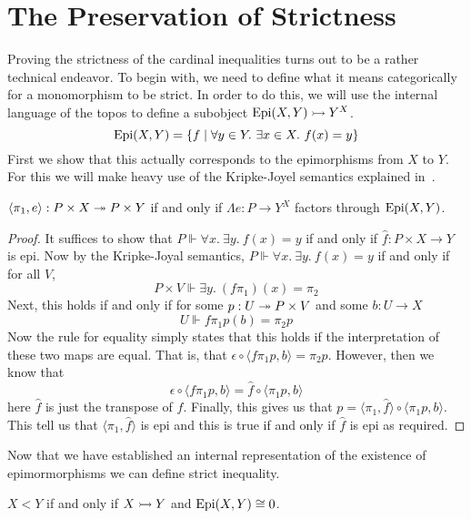 \section{The Preservation of Strictness}\label{sec:strictness}

Proving the strictness of the cardinal inequalities turns out to be a
rather technical endeavor. To begin with, we need to define what it
means categorically for a monomorphism to be strict. In order to do
this, we will use the internal language of the topos to define a
subobject $\operatorname{Epi}(X, Y) \rightarrowtail Y^X$.
\[
  \epis(X, Y) = \{f \mid \forall y \in Y.\ \exists x \in X.\ f(x) = y\}
\]
First we show that this actually corresponds to the epimorphisms from
$X$ to $Y$. For this we will make heavy use of the Kripke-Joyel
semantics explained in~\citet[Chapter~6]{MacLane:92}.

\begin{lem}\label{lem:strictness:epis}
  $\langle \pi_1, e \rangle : P \times X \twoheadrightarrow P \times Y$ if and only if
  $\Lambda e : P \to Y^X$ factors through $\operatorname{Epi}(X, Y)$.
\end{lem}
\begin{proof}
  It suffices to show that $P \Vdash \forall x.\ \exists y.\ f(x) = y$
  if and only if $\hat{f} : P \times X \to Y$ is epi. Now by the
  Kripke-Joyal semantics, $P \Vdash \forall x.\ \exists y.\ f(x) = y$
  if and only if for all $V$,
  \[
    P \times V \Vdash \exists y.\ (f\pi_1)(x) = \pi_2
  \]
  Next, this holds if and only if for some $p : U \twoheadrightarrow P \times V$
  and some $b : U \to X$
  \[
    U \Vdash f\pi_1p(b) = \pi_2p
  \]
  Now the rule for equality simply states that this holds if the
  interpretation of these two maps are equal. That is, that
  $\epsilon \circ \langle f\pi_1p, b \rangle = \pi_2p$. However, then
  we know that
  \[
    \epsilon \circ \langle f\pi_1p, b \rangle =
    \hat{f} \circ \langle \pi_1 p, b \rangle
  \]
  here $\hat{f}$ is just the transpose of $f$. Finally, this gives us that
  $p = \langle \pi_1, \hat{f} \rangle \circ \langle \pi_1 p, b \rangle$.
  This tell us that $\langle \pi_1, \hat{f} \rangle$ is epi and this is
  true if and only if $\hat{f}$ is epi as required.
\end{proof}

Now that we have established an internal representation of the
existence of epimormorphisms we can define strict inequality.

\begin{defn}
  $X < Y$ if and only if $X \rightarrowtail Y$ and $\operatorname{Epi}(X, Y) \cong 0$.
\end{defn}

